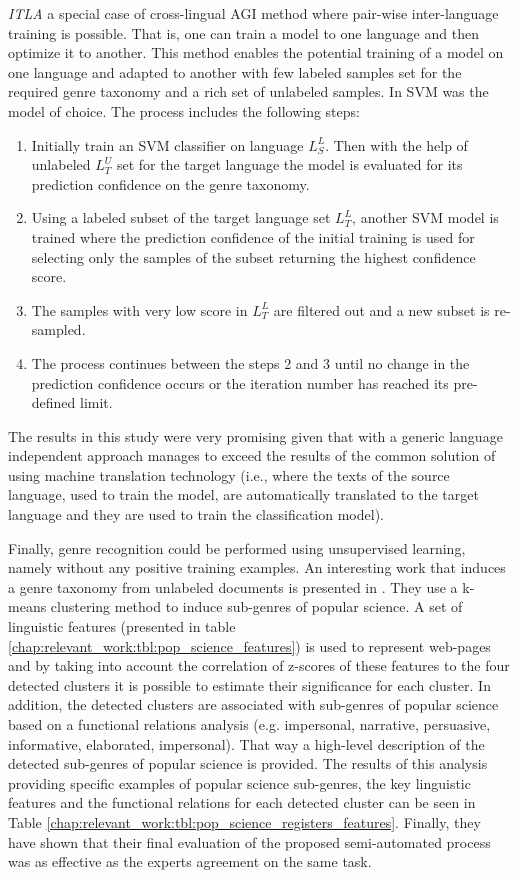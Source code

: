 \textit{ITLA} a special case of cross-lingual AGI method where pair-wise inter-language training is possible. That is, one can train a model to one language and then optimize it to another. This method enables the potential training of a model on one language and adapted to another with few labeled samples set for the required genre taxonomy and a rich set of unlabeled samples. In \parencite{petrenz2011stable} SVM was the model of choice. The process includes the following steps:

\begin{enumerate}
\item Initially train an SVM classifier on language $L^{L}_{S}$. Then with the help of unlabeled $L^{U}_{T}$ set for the target language the model is evaluated for its prediction confidence on the genre taxonomy.
\item Using a labeled subset of the target language set $L^{L}_{T}$, another SVM model is trained where the prediction confidence of the initial training is used for selecting only the samples of the subset returning the highest confidence score. 
\item The samples with very low score in $L^{L}_{T}$ are filtered out and a new subset is re-sampled.
\item The process continues between the steps 2 and 3 until no change in the prediction confidence occurs or the iteration number has reached its pre-defined limit.
\end{enumerate}

The results in this study were very promising given that with a generic language independent approach manages to exceed the results of the common solution of using machine translation technology (i.e., where the texts of the  source language, used to train the model, are automatically translated to the target language and they are used to train the classification model).

Finally, genre recognition could be performed using unsupervised learning, namely without any positive training examples. An interesting work that induces a genre taxonomy from unlabeled documents is presented in \parencite{lieungnapar2017genre}. They use a k-means clustering method to induce sub-genres of popular science. A set of linguistic features (presented in table \ref{chap:relevant_work:tbl:pop_science_features}) is used to represent web-pages and by taking into account the correlation of z-scores of these features to the four detected clusters it is possible to estimate their significance for each cluster. In addition, the detected clusters are associated with sub-genres of popular science based on a functional relations analysis (e.g. impersonal, narrative, persuasive, informative, elaborated, impersonal). That way a high-level description of the detected sub-genres of popular science is provided. The results of this analysis providing specific examples of popular science sub-genres, the key linguistic features and the functional relations for each detected cluster can be seen in Table \ref{chap:relevant_work:tbl:pop_science_registers_features}. Finally, they have shown that their final evaluation of the proposed semi-automated process was as effective as the experts agreement on the same task. 

